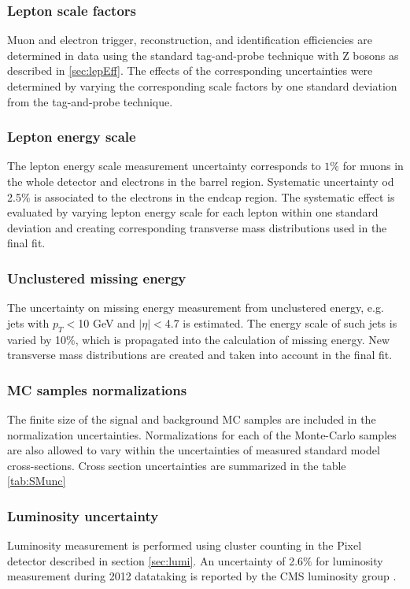 \subsubsection*{Lepton scale factors}
        Muon and electron trigger, reconstruction, and identification efficiencies are determined in data using the standard tag-and-probe technique with Z bosons as described in \ref{sec:lepEff}. The effects of the corresponding uncertainties were determined by varying the corresponding scale factors by one standard deviation from the tag-and-probe technique. 
\subsubsection*{Lepton energy scale} 
		The lepton energy scale measurement uncertainty corresponds to $1\%$ for muons in the whole detector and electrons in the barrel region. Systematic uncertainty od 2.5$\%$ is associated to the electrons in the endcap region. The systematic effect is evaluated by varying lepton energy scale for each lepton within one standard deviation and creating corresponding transverse mass distributions used in the final fit.
\subsubsection*{Unclustered missing energy}
        The uncertainty on missing energy measurement from unclustered energy, e.g. jets with $p_T<$10 GeV and $|\eta|<$4.7 is estimated. The energy scale of such jets is varied by 10$\%$, which is propagated into the calculation of missing energy. New transverse mass distributions are created and taken into account in the final fit.
\subsubsection*{MC samples normalizations}
        The finite size of the signal and background MC samples are included in the normalization uncertainties. Normalizations for each of the Monte-Carlo samples are also allowed to vary within the uncertainties of measured standard model cross-sections. Cross section uncertainties are summarized in the table \ref{tab:SMunc}
\subsubsection*{Luminosity uncertainty}
        Luminosity measurement is performed using cluster counting in the Pixel detector described in section \ref{sec:lumi}. An uncertainty of 2.6$\%$ for luminosity measurement during 2012 datataking is reported by the CMS luminosity group \cite{CMS-PAS-LUM-13-001}.

